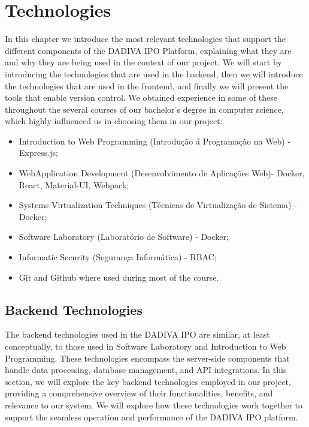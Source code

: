%
%
\chapter{Technologies} \label{cap:technologies}

 In this chapter we introduce the most relevant technologies that support the different
components of the DADIVA IPO Platform, explaining what they are and why they are being used in the context of our project.
We will start by introducing the technologies that are used in the backend, then
we will introduce the technologies that are used in the frontend, and finally we will
present the tools that enable version control.
We obtained experience in some of these throughout the several courses of our
bachelor’s degree in computer science, which highly influenced us in choosing them in
our project:
\begin{itemize}
	\item Introduction to Web Programming (Introdução á Programação na Web) - Express.js;
	\item WebApplication Development (Desenvolvimento de Aplicações Web)- Docker, React, Material-UI, Webpack;
	\item Systems Virtualization Techniques (Técnicas de Virtualização de Sistema) - Docker;
	\item Software Laboratory (Laboratório de Software) - Docker;
	\item Informatic Security (Segurança Informática) - RBAC;
	\item Git and Github where used during most of the course.
\end{itemize}

\section{Backend Technologies}

The backend technologies used in the DADIVA IPO are similar, at least conceptually, to those used in Software Laboratory and Introduction to Web Programming. These technologies encompass the server-side components that handle data processing, database management, and API integrations. In this section, we will explore the key backend technologies employed in our project, providing a comprehensive overview of their functionalities, benefits, and relevance to our system. We will explore how these technologies work together to support the seamless operation and performance of the DADIVA IPO platform.

